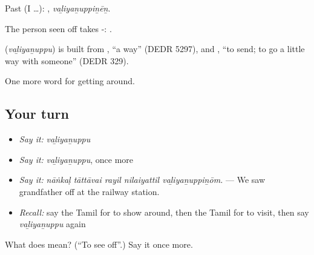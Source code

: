 Past (I …): , \emph{vaḻiyaṉuppiṉēṉ}.

The person seen off takes -:  .

\begin{cousinweb}
\textbf{} (\emph{vaḻiyaṉuppu}) is built from , \textquotedblleft{}a way\textquotedblright{} (DEDR 5297), and , \textquotedblleft{}to send; to go a little way with someone\textquotedblright{} (DEDR 329).
\end{cousinweb}

\begin{grammarlens}[title={What you've built}]
One more word for getting around.
\end{grammarlens}

\subsection*{Your turn}
\begin{itemize}
\raggedright
  \item \emph{Say it:} \emph{vaḻiyaṉuppu}
  \item \emph{Say it:} \emph{vaḻiyaṉuppu}, once more
  \item \emph{Say it:} \emph{nāṅkaḷ tāttāvai rayil nilaiyattil vaḻiyaṉuppiṉōm.} — We saw grandfather off at the railway station.
  \item \emph{Recall:} say the Tamil for to show around, then the Tamil for to visit, then say \emph{vaḻiyaṉuppu} again
\end{itemize}

\begin{tcolorbox}[breakable,colback=teal!4,colframe=teal!35!black,title={Before you move on}]
What does  mean? (\textquotedblleft{}To see off\textquotedblright{}.) Say it once more.
\end{tcolorbox}

